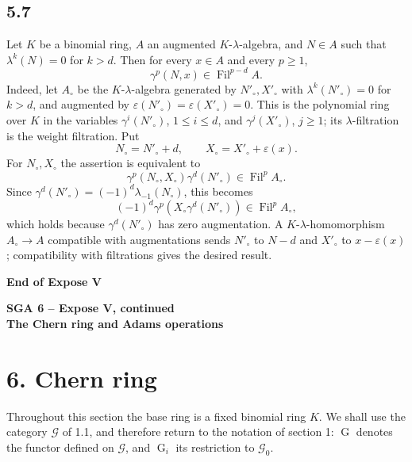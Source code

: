\documentclass[11pt]{article}
\theoremstyle{plain}
\theoremstyle{definition}
\theoremstyle{remark}
\providecommand{\Fil}{\operatorname{Fil}}
\providecommand{\Go}{\operatorname{G}}
\providecommand{\Goi}{\operatorname{G}_i}
\begin{document}
\subsection*{5.7}
Let $K$ be a binomial ring, $A$ an augmented $K$-$\lambda$-algebra, and $N\in A$ such that $\lambda^k(N)=0$ for $k>d$. Then for every $x\in A$ and every $p\geq 1$,
\begin{equation}\label{eq:5.7.1}
\gamma^p(N,x)\in\Fil^{p-d}A.
\end{equation}
Indeed, let $A_\circ$ be the $K$-$\lambda$-algebra generated by $N'_\circ,X'_\circ$ with $\lambda^k(N'_\circ)=0$ for $k>d$, and augmented by $\varepsilon(N'_\circ)=\varepsilon(X'_\circ)=0$. This is the polynomial ring over $K$ in the variables $\gamma^i(N'_\circ)$, $1\leq i\leq d$, and $\gamma^j(X'_\circ)$, $j\geq 1$; its $\lambda$-filtration is the weight filtration. Put
\[
N_\circ=N'_\circ+d,
\qquad
X_\circ=X'_\circ+\varepsilon(x).
\]
For $N_\circ,X_\circ$ the assertion is equivalent to
\[
\gamma^p(N_\circ,X_\circ)\gamma^d(N'_\circ)\in\Fil^pA_\circ.
\]
Since $\gamma^d(N'_\circ)=(-1)^d\lambda_{-1}(N_\circ)$, this becomes
\[
(-1)^d\gamma^p(X_\circ\gamma^d(N'_\circ))\in\Fil^pA_\circ,
\]
which holds because $\gamma^d(N'_\circ)$ has zero augmentation. A $K$-$\lambda$-homomorphism $A_\circ\to A$ compatible with augmentations sends $N'_\circ$ to $N-d$ and $X'_\circ$ to $x-\varepsilon(x)$; compatibility with filtrations gives the desired result.

\begin{center}
\textbf{End of Expose V}
\end{center}

\clearpage

\begin{center}
{\Large\textbf{SGA 6 -- Expose V, continued}}\\[0.35em]
{\large\textbf{The Chern ring and Adams operations}}
\end{center}

\section*{6. Chern ring}

Throughout this section the base ring is a fixed binomial ring $K$. We shall use the category $\mathcal G$ of 1.1, and therefore return to the notation of section 1: $\Go$ denotes the functor defined on $\mathcal G$, and $\Goi$ its restriction to $\mathcal G_0$.
\end{document}
